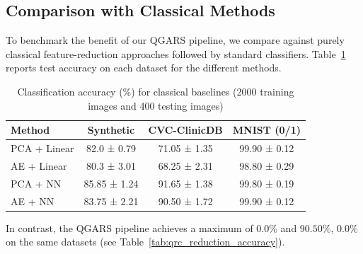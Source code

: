 \documentclass[conference]{IEEEtran}
\begin{document}




\subsection{Comparison with Classical Methods}
To benchmark the benefit of our QGARS pipeline, 
we compare against purely classical feature-reduction 
approaches followed by standard classifiers. 
Table~\ref{tab:classical_comp} reports test accuracy on each dataset 
for the different methods.

\begin{table}[tb]
  \caption{Classification accuracy (\%) for classical baselines (2000 training images and 400 testing images)}
  \label{tab:classical_comp}
  \centering
  \begin{tabular}{lccc}
    \hline
    Method            & Synthetic & CVC-ClinicDB & MNIST (0/1) \\
    \hline
    PCA + Linear      &  82.0 ± 0.79    &  71.05 ± 1.35   &  99.90 ± 0.12    \\
    AE + Linear       &  80.3 ± 3.01    &  68.25 ± 2.31   &  98.80 ± 0.29    \\
    PCA + NN          &  85.85 ± 1.24   &  91.65 ± 1.38   &  99.80 ± 0.19    \\
    AE + NN           &  83.75 ± 2.21   &  90.50 ± 1.72   &  99.90 ± 0.12    \\
    \hline
  \end{tabular}
\end{table}

\noindent
In contrast, the QGARS pipeline achieves a maximum of $\mathbf{0.0\%}$ and $\mathbf{90.50\%}$, $\mathbf{0.0\%}$ on the same datasets (see Table~\ref{tab:qrc_reduction_accuracy}).
\end{document}
